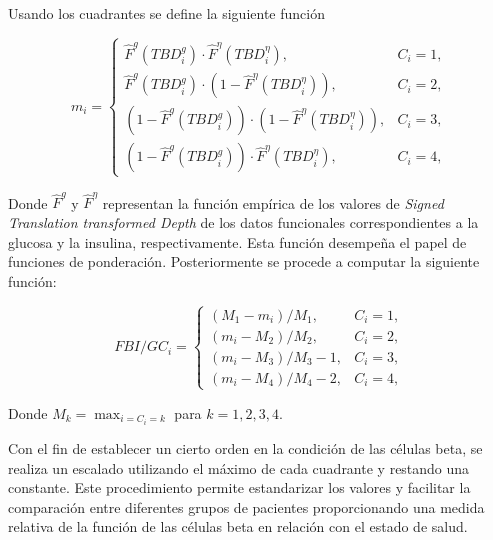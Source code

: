 Usando los cuadrantes se define la siguiente función

\begin{equation}
    m_i= \begin{cases}
    \widehat{F}^g\left(T B D_i^g\right) \cdot \widehat{F}^\eta\left(T B D_i^\eta\right), & C_i=1, \\ \widehat{F}^g\left(T B D_i^g\right) \cdot\left(1-\widehat{F}^\eta\left(T B D_i^\eta\right)\right), & C_i=2, \\ \left(1-\widehat{F}^g\left(T B D_i^g\right)\right) \cdot\left(1-\widehat{F}^\eta\left(T B D_i^\eta\right)\right), & C_i=3, \\ \left(1-\widehat{F}^g\left(T B D_i^g\right)\right) \cdot \widehat{F}^\eta\left(T B D_i^\eta\right), & C_i=4,\end{cases}
\end{equation}


Donde $\widehat{F}^g$ y $\widehat{F}^{\eta}$ representan la función empírica de los valores de \textit{Signed Translation transformed Depth} de los datos funcionales correspondientes a la glucosa y la insulina, respectivamente. Esta función desempeña el papel de funciones de ponderación. Posteriormente se procede a computar la siguiente función:

\begin{equation}
    F B I / G C_i= \begin{cases}\left(M_1-m_i\right) / M_1, & C_i=1, \\ \left(m_i-M_2\right) / M_2, & C_i=2, \\ \left(m_i-M_3\right) / M_3-1, & C_i=3, \\ \left(m_i-M_4\right) / M_4-2, & C_i=4,\end{cases}
\end{equation}

Donde $M_k = \max_{i = C_i = k}$ para $k = 1, 2, 3, 4$.


Con el fin de establecer un cierto orden en la condición de las células beta, se realiza un escalado utilizando el máximo de cada cuadrante y restando una constante. Este procedimiento permite estandarizar los valores y facilitar la comparación entre diferentes grupos de pacientes proporcionando una medida relativa de la función de las células beta en relación con el estado de salud.

